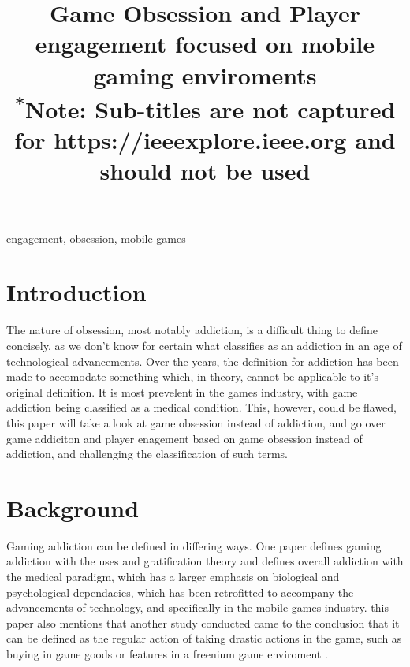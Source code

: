 \documentclass[conference]{IEEEtran}
\begin{document}
\title{Game Obsession and Player engagement focused on mobile gaming enviroments\\
{\footnotesize \textsuperscript{*}Note: Sub-titles are not captured for https://ieeexplore.ieee.org  and
should not be used}
}

\author{
}

\maketitle



\begin{abstract}

\end{abstract}

\begin{IEEEkeywords}
engagement, obsession, mobile games
\end{IEEEkeywords}

\section{Introduction}
The nature of obsession, most notably addiction, is a difficult thing to define concisely, as we don't know for certain what classifies as an addiction in an age of technological advancements. Over the years, the definition for addiction has been made to accomodate something which, in theory, cannot be applicable to it's original definition. It is most prevelent in the games industry, with game addiction being classified as a medical condition. This, however, could be flawed, this paper will take a look at game obsession instead of addiction, and go over game addiciton and player enagement based on game obsession instead of addiction, and challenging the classification of such terms.\\
\section{Background}
Gaming addiction can be defined in differing ways. One paper \cite{yasir2021} defines gaming addiction with the uses and gratification theory and defines overall addiction with the medical paradigm, which has a larger emphasis on biological and psychological dependacies, which has been retrofitted to accompany the advancements of technology, and specifically in the mobile games industry. this paper also mentions that another study conducted came to the conclusion that it can be defined as the regular action of taking drastic actions in the game, such as buying in game goods or features in a freenium game enviroment \cite{XWang2021}. \\
\end{document}
